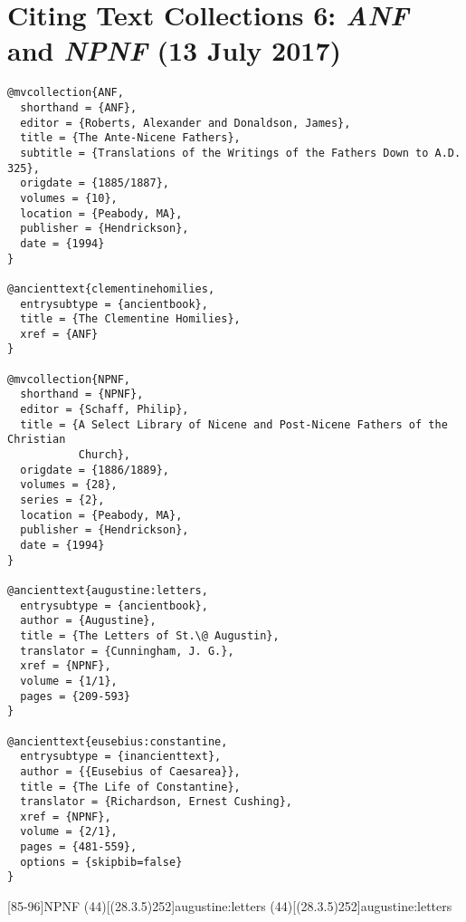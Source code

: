 \documentclass[a4paper]{article}
\renewcommand\footnote[1]{##1}%
\begin{document}
\exampleabbreviations
{}

\section{Citing Text Collections 6: \emph{ANF} and \emph{NPNF} (13 July 2017)}

\begin{verbatim}
@mvcollection{ANF,
  shorthand = {ANF},
  editor = {Roberts, Alexander and Donaldson, James},
  title = {The Ante-Nicene Fathers},
  subtitle = {Translations of the Writings of the Fathers Down to A.D. 325},
  origdate = {1885/1887},
  volumes = {10},
  location = {Peabody, MA},
  publisher = {Hendrickson},
  date = {1994}
}

@ancienttext{clementinehomilies,
  entrysubtype = {ancientbook},
  title = {The Clementine Homilies},
  xref = {ANF}
}

@mvcollection{NPNF,
  shorthand = {NPNF},
  editor = {Schaff, Philip},
  title = {A Select Library of Nicene and Post-Nicene Fathers of the Christian
           Church},
  origdate = {1886/1889},
  volumes = {28},
  series = {2},
  location = {Peabody, MA},
  publisher = {Hendrickson},
  date = {1994}
}

@ancienttext{augustine:letters,
  entrysubtype = {ancientbook},
  author = {Augustine},
  title = {The Letters of St.\@ Augustin},
  translator = {Cunningham, J. G.},
  xref = {NPNF},
  volume = {1/1},
  pages = {209-593}
}

@ancienttext{eusebius:constantine,
  entrysubtype = {inancienttext},
  author = {{Eusebius of Caesarea}},
  title = {The Life of Constantine},
  translator = {Richardson, Ernest Cushing},
  xref = {NPNF},
  volume = {2/1},
  pages = {481-559},
  options = {skipbib=false}
}
\end{verbatim}

[85-96]{NPNF}
\examplecite(44)[(28.3.5)252]{augustine:letters}
\examplecite[atrans](44)[(28.3.5)252]{augustine:letters}
\begin{verbcite}
  \nocite{ANF, eusebius:constantine}
\end{verbcite}
\exampleabbreviations
\examplebibliography
{}
\end{document}
